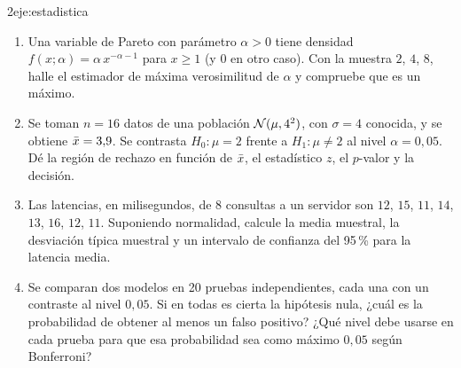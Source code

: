 \begin{ejercicio}{2}{eje:estadistica}
\begin{enumerate}[label=(\alph*)]
  \item {} Una variable de Pareto con parámetro $\alpha>0$ tiene densidad $f(x;\alpha)=\alpha\,x^{-\alpha-1}$ para $x\ge1$ (y $0$ en otro caso). Con la muestra $2$, $4$, $8$, halle el estimador de máxima verosimilitud de $\alpha$ y compruebe que es un máximo.
  \item {} Se toman $n=16$ datos de una población $\mathcal{N}(\mu,4^{2})$, con $\sigma=4$ conocida, y se obtiene $\bar{x}=3{,}9$. Se contrasta $H_0\colon\mu=2$ frente a $H_1\colon\mu\neq2$ al nivel $\alpha=0{,}05$. Dé la región de rechazo en función de $\bar{x}$, el estadístico $z$, el $p$-valor y la decisión.
  \item {} Las latencias, en milisegundos, de 8 consultas a un servidor son $12$, $15$, $11$, $14$, $13$, $16$, $12$, $11$. Suponiendo normalidad, calcule la media muestral, la desviación típica muestral y un intervalo de confianza del 95\,\% para la latencia media.
  \item {} Se comparan dos modelos en 20 pruebas independientes, cada una con un contraste al nivel $0{,}05$. Si en todas es cierta la hipótesis nula, ¿cuál es la probabilidad de obtener al menos un falso positivo? ¿Qué nivel debe usarse en cada prueba para que esa probabilidad sea como máximo $0{,}05$ según Bonferroni?
\end{enumerate}
\end{ejercicio}
